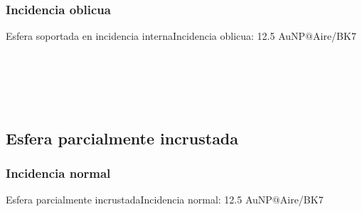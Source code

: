 \subsubsection{Incidencia oblicua}
    \begin{frame}{Esfera soportada en incidencia interna}{Incidencia oblicua: 12.5 AuNP$@$Aire/BK7}
    \begin{columns}
    \begin{figure}\centering
      \def\svgwidth{1 \textwidth}
    \end{figure}
    \begin{figure}    \centering \fontsize{4}{5}\selectfont
        \def\svgwidth{1\textwidth}
        \\[2em]
        \def\svgwidth{1\textwidth}
    \end{figure}
    \end{columns}
    \end{frame}
%
  \subsection{Esfera parcialmente incrustada}
    \subsubsection{Incidencia normal}
      \begin{frame}{Esfera parcialmente incrustada}{Incidencia normal: 12.5 AuNP$@$Aire/BK7}
      \renewcommand{\newcirc}{{\scaleobj{.625}{\circ}}}
      \centering
      \begin{columns}
      \begin{figure}    \centering \fontsize{4}{5}\selectfont
          \def\svgwidth{.96\textwidth}
          \\
          \def\svgwidth{.96\textwidth}
          \hspace{.5em}%
      \end{figure}
      \begin{figure}\centering
        \def\svgwidth{.8\textwidth}\vspace*{-2em} \fontsize{4}{5}\selectfont
      \end{figure}
      \end{columns}
      \end{frame}
%

